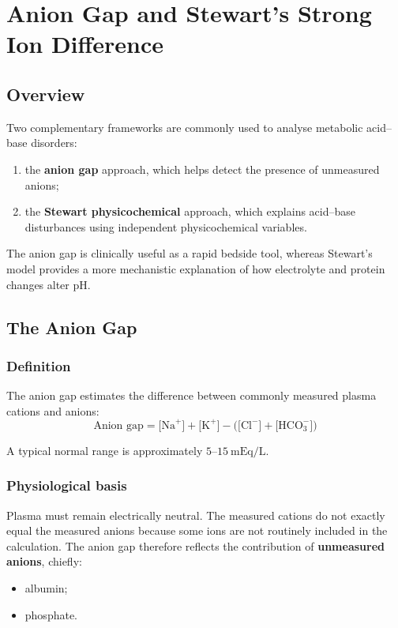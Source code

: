 \documentclass[11pt,a4paper]{article}
\begin{document}

\section{Anion Gap and Stewart's Strong Ion Difference}

\subsection{Overview}

Two complementary frameworks are commonly used to analyse metabolic acid--base disorders:
\begin{enumerate}[label=\arabic*.]
    \item the \textbf{anion gap} approach, which helps detect the presence of unmeasured anions;
    \item the \textbf{Stewart physicochemical} approach, which explains acid--base disturbances using independent physicochemical variables.
\end{enumerate}

The anion gap is clinically useful as a rapid bedside tool, whereas Stewart's model provides a more mechanistic explanation of how electrolyte and protein changes alter pH.

\subsection{The Anion Gap}

\subsubsection{Definition}

The anion gap estimates the difference between commonly measured plasma cations and anions:
\[
\text{Anion gap} = \bigl[\mathrm{Na}^+\bigr] + \bigl[\mathrm{K}^+\bigr] - \bigl(\bigl[\mathrm{Cl}^-\bigr] + \bigl[\mathrm{HCO}_3^-\bigr]\bigr)
\]

A typical normal range is approximately \(5\text{--}15~\mathrm{mEq/L}\).

\subsubsection{Physiological basis}

Plasma must remain electrically neutral. The measured cations do not exactly equal the measured anions because some ions are not routinely included in the calculation. The anion gap therefore reflects the contribution of \textbf{unmeasured anions}, chiefly:
\begin{itemize}
    \item albumin;
    \item phosphate.
\end{itemize}
\end{document}
